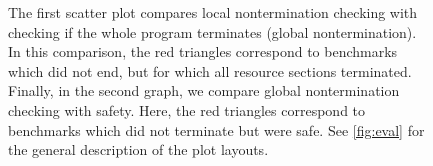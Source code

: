 \begin{figure}[tbp]
% 
\caption{
The first scatter plot compares local nontermination checking with checking if the whole program terminates (global nontermination).
In this comparison, the red triangles correspond to benchmarks which did not end, but for which all resource sections terminated.
Finally, in the second graph, we compare global nontermination checking with safety.
Here, the red triangles correspond to benchmarks which did not terminate but were safe.
See \autoref{fig:eval} for the general description of the plot layouts.
} \label{fig:eval2}
\end{figure}

